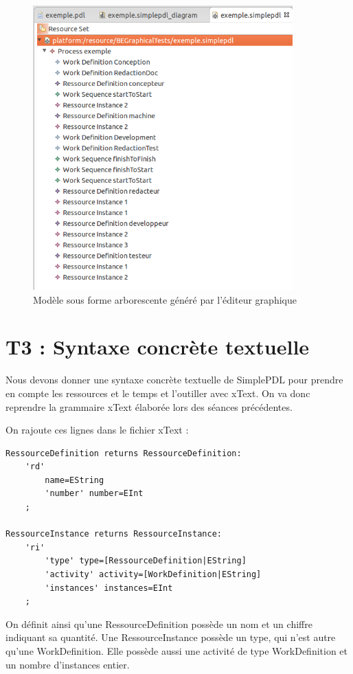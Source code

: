\documentclass{report}
\begin{document}
\begin{figure}[!h] 
\begin{center}
\includegraphics[width=10cm]{Capture-9.png}
\caption{Modèle sous forme arborescente généré par l'éditeur graphique} 
\label{img1} 
\end{center}
\end{figure} 

\newpage

\section{T3 : Syntaxe concrète textuelle}

Nous devons donner une syntaxe concrète textuelle de SimplePDL pour prendre en compte les ressources et le temps et l’outiller avec xText. On va donc reprendre la grammaire xText élaborée lors des séances précédentes.

On rajoute ces lignes dans le fichier xText :\\

\begin{verbatim}
RessourceDefinition returns RessourceDefinition:
	'rd'
		name=EString
		'number' number=EInt
	;

RessourceInstance returns RessourceInstance:
	'ri'
		'type' type=[RessourceDefinition|EString]
		'activity' activity=[WorkDefinition|EString]
		'instances' instances=EInt
	;
\end{verbatim}

On définit ainsi qu'une RessourceDefinition possède un nom et un chiffre indiquant sa quantité. Une RessourceInstance possède un type, qui n'est autre qu'une WorkDefinition.
Elle possède aussi une activité de type WorkDefinition et un nombre d'instances entier.\\
\end{document}
